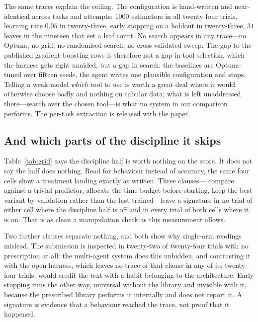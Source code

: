 The same traces explain the ceiling. The configuration is hand-written and
near-identical across tasks and attempts: $1000$ estimators in all twenty-four
trials, learning rate $0.05$ in twenty-three, early stopping on a holdout in
twenty-three, $31$ leaves in the nineteen that set a leaf count. No search
appears in any trace---no Optuna, no grid, no randomised search, no
cross-validated sweep. The gap to the published gradient-boosting rows is
therefore not a gap in tool selection, which the harness gets right unaided, but
a gap in search: the baselines are Optuna-tuned over fifteen seeds, the agent
writes one plausible configuration and stops. Telling a weak model \emph{which}
tool to use is worth a great deal where it would otherwise choose badly and
nothing on tabular data; what is left unaddressed there---search over the chosen
tool---is what no system in our comparison performs. The per-task extraction is
released with the paper.

\subsection{And which parts of the discipline it skips}
\label{sec:discipline}

Table~\ref{tab:grid} says the discipline half is worth nothing on the score. It
does not say the half does nothing. Read for behaviour instead of accuracy, the
same four cells show a treatment landing exactly as written. Three clauses---%
compare against a trivial predictor, allocate the time budget before starting,
keep the best variant by validation rather than the last trained---leave a
signature in no trial of either cell where the discipline half is off and in
every trial of both cells where it is on. That is as clean a manipulation check
as this measurement allows.

Two further clauses separate nothing, and both show why single-arm readings
mislead. The submission is inspected in twenty-two of twenty-four trials with no
prescription at all: the multi-agent system does this unbidden, and contrasting
it with the open harness, which leaves no trace of that clause in any of its
twenty-four trials, would credit the text with a habit belonging to the
architecture. Early stopping runs the other way, universal without the library
and invisible with it, because the prescribed library performs it internally and
does not report it. A signature is evidence that a behaviour reached the trace,
not proof that it happened.

